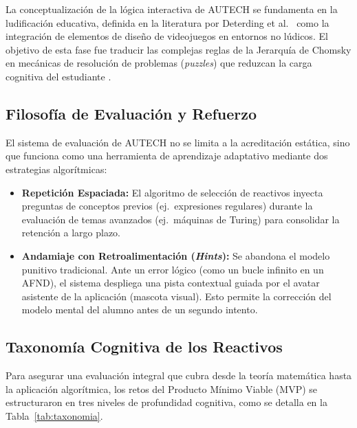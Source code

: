 La conceptualización de la lógica interactiva de AUTECH se fundamenta en la ludificación educativa,
definida en la literatura por Deterding et al.\ \cite{deterding2011} como la integración de
elementos de diseño de videojuegos en entornos no lúdicos. El objetivo de esta fase fue traducir
las complejas reglas de la Jerarquía de Chomsky en mecánicas de resolución de problemas
(\textit{puzzles}) que reduzcan la carga cognitiva del estudiante \cite{sweller1988}.

\subsection{Filosofía de Evaluación y Refuerzo}
\label{subsec:filosofia_evaluacion}

El sistema de evaluación de AUTECH no se limita a la acreditación estática, sino que funciona como
una herramienta de aprendizaje adaptativo mediante dos estrategias algorítmicas:

\begin{itemize}
    \item \textbf{Repetición Espaciada:} El algoritmo de selección de reactivos inyecta preguntas
    de conceptos previos (ej.\ expresiones regulares) durante la evaluación de temas avanzados
    (ej.\ máquinas de Turing) para consolidar la retención a largo plazo.

    \item \textbf{Andamiaje con Retroalimentación (\textit{Hints}):} Se abandona el modelo
    punitivo tradicional. Ante un error lógico (como un bucle infinito en un AFND), el sistema
    despliega una pista contextual guiada por el avatar asistente de la aplicación (mascota visual).
    Esto permite la corrección del modelo mental del alumno antes de un segundo intento.
\end{itemize}

\subsection{Taxonomía Cognitiva de los Reactivos}
\label{subsec:taxonomia}

Para asegurar una evaluación integral que cubra desde la teoría matemática hasta la aplicación
algorítmica, los retos del Producto Mínimo Viable (MVP) se estructuraron en tres niveles de
profundidad cognitiva, como se detalla en la Tabla~\ref{tab:taxonomia}.

